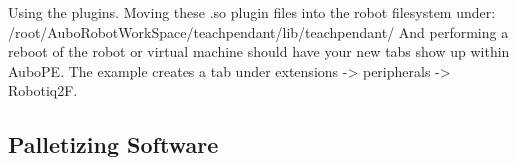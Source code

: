\documentclass{article}
\begin{document}
Using the plugins.
Moving these .so plugin files into the robot filesystem under: /root/AuboRobotWorkSpace/teachpendant/lib/teachpendant/
And performing a reboot of the robot or virtual machine should have your new tabs show up within AuboPE. The example creates a tab under extensions -> peripherals -> Robotiq2F.


\subsection{Palletizing Software}
\end{document}

